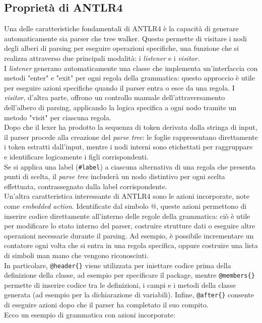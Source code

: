 \documentclass{article}
\begin{document}
\subsection{Proprietà di ANTLR4}
Una delle caratteristiche fondamentali di ANTLR4 è la capacità di generare automaticamente sia parser che tree walker. Questo permette di visitare i nodi degli alberi di parsing per eseguire operazioni specifiche, una funzione che si realizza attraverso due principali modalità: i \textit{listener} e i \textit{visitor}.\\
\noindent
I \textit{listener} generano automaticamente una classe che implementa un'interfaccia con metodi "enter" e "exit" per ogni regola della grammatica: questo approccio è utile per eseguire azioni specifiche quando il parser entra o esce da una regola. I \textit{visitor}, d'altra parte, offrono un controllo manuale dell'attraversamento dell'albero di parsing, applicando la logica specifica a ogni nodo tramite un metodo "visit" per ciascuna regola.
\\\noindent
Dopo che il lexer ha prodotto la sequenza di token derivata dalla stringa di input, il parser procede alla creazione del \textit{parse tree}: le foglie rappresentano direttamente i token estratti dall'input, mentre i nodi interni sono etichettati per raggruppare e identificare logicamente i figli corrispondenti. \\
\noindent
Se si applica una label (\texttt{\#label}) a ciascuna alternativa di una regola che presenta punti di scelta, il \textit{parse tree} includerà un nodo distintivo per ogni scelta effettuata, contrassegnato dalla label corrispondente.
\\\noindent
Un'altra caratteristica interessante di ANTLR4 sono le azioni incorporate, note come \textit{embedded action}. Identificate dal simbolo \texttt{$@$}, queste azioni permettono di inserire codice direttamente all'interno delle regole della grammatica: ciò è utile per modificare lo stato interno del parser, costruire strutture dati o eseguire altre operazioni necessarie durante il parsing. Ad esempio, è possibile incrementare un contatore ogni volta che si entra in una regola specifica, oppure costruire una lista di simboli man mano che vengono riconosciuti.
\\\noindent
In particolare, \texttt{@header\{\}} viene utilizzata per iniettare codice prima della definizione della classe, ad esempio per specificare il package, mentre \texttt{@members\{\}} permette di inserire codice tra le definizioni, i campi e i metodi della classe generata (ad esempio per la dichiarazione di variabili). Infine, \texttt{@after\{\}} consente di eseguire azioni dopo che il parser ha completato il suo compito.
\\\noindent
Ecco un esempio di grammatica con azioni incorporate:
\end{document}
